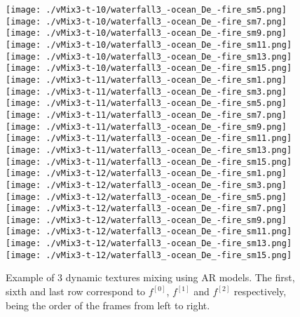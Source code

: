 \begin{figure}[ht!]
{    \texttt{[image: ./vMix3-t-10/waterfall3\_-ocean\_De\_-fire\_sm5.png]}
    \texttt{[image: ./vMix3-t-10/waterfall3\_-ocean\_De\_-fire\_sm7.png]}
    \texttt{[image: ./vMix3-t-10/waterfall3\_-ocean\_De\_-fire\_sm9.png]}
    \texttt{[image: ./vMix3-t-10/waterfall3\_-ocean\_De\_-fire\_sm11.png]}
    \texttt{[image: ./vMix3-t-10/waterfall3\_-ocean\_De\_-fire\_sm13.png]}
    \texttt{[image: ./vMix3-t-10/waterfall3\_-ocean\_De\_-fire\_sm15.png]} \\
\vspace{1mm}
    \texttt{[image: ./vMix3-t-11/waterfall3\_-ocean\_De\_-fire\_sm1.png]}
    \texttt{[image: ./vMix3-t-11/waterfall3\_-ocean\_De\_-fire\_sm3.png]}
    \texttt{[image: ./vMix3-t-11/waterfall3\_-ocean\_De\_-fire\_sm5.png]}
    \texttt{[image: ./vMix3-t-11/waterfall3\_-ocean\_De\_-fire\_sm7.png]}
    \texttt{[image: ./vMix3-t-11/waterfall3\_-ocean\_De\_-fire\_sm9.png]}
    \texttt{[image: ./vMix3-t-11/waterfall3\_-ocean\_De\_-fire\_sm11.png]}
    \texttt{[image: ./vMix3-t-11/waterfall3\_-ocean\_De\_-fire\_sm13.png]}
    \texttt{[image: ./vMix3-t-11/waterfall3\_-ocean\_De\_-fire\_sm15.png]} \\
\vspace{1mm}
    \texttt{[image: ./vMix3-t-12/waterfall3\_-ocean\_De\_-fire\_sm1.png]}
    \texttt{[image: ./vMix3-t-12/waterfall3\_-ocean\_De\_-fire\_sm3.png]}
    \texttt{[image: ./vMix3-t-12/waterfall3\_-ocean\_De\_-fire\_sm5.png]}
    \texttt{[image: ./vMix3-t-12/waterfall3\_-ocean\_De\_-fire\_sm7.png]}
    \texttt{[image: ./vMix3-t-12/waterfall3\_-ocean\_De\_-fire\_sm9.png]}
    \texttt{[image: ./vMix3-t-12/waterfall3\_-ocean\_De\_-fire\_sm11.png]}
    \texttt{[image: ./vMix3-t-12/waterfall3\_-ocean\_De\_-fire\_sm13.png]}
    \texttt{[image: ./vMix3-t-12/waterfall3\_-ocean\_De\_-fire\_sm15.png]} \\
    }
    \caption{
        Example of $3$ dynamic textures mixing using AR models. The first, sixth and last row correspond to $f^{[0]}$, $f^{[1]}$ and $f^{[2]}$ respectively, being the order of the frames from left to right.
    }
\label{fig:dynamic-barycenter-ar}
\end{figure}
